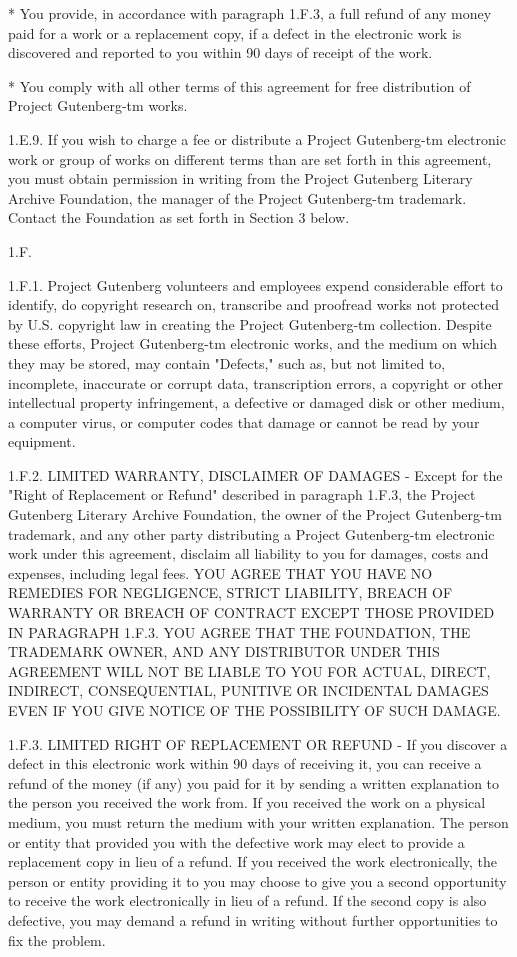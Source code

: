 * You provide, in accordance with paragraph 1.F.3, a full refund of
  any money paid for a work or a replacement copy, if a defect in the
  electronic work is discovered and reported to you within 90 days of
  receipt of the work.

* You comply with all other terms of this agreement for free
  distribution of Project Gutenberg-tm works.

1.E.9. If you wish to charge a fee or distribute a Project
Gutenberg-tm electronic work or group of works on different terms than
are set forth in this agreement, you must obtain permission in writing
from the Project Gutenberg Literary Archive Foundation, the manager of
the Project Gutenberg-tm trademark. Contact the Foundation as set
forth in Section 3 below.

1.F.

1.F.1. Project Gutenberg volunteers and employees expend considerable
effort to identify, do copyright research on, transcribe and proofread
works not protected by U.S. copyright law in creating the Project
Gutenberg-tm collection. Despite these efforts, Project Gutenberg-tm
electronic works, and the medium on which they may be stored, may
contain "Defects," such as, but not limited to, incomplete, inaccurate
or corrupt data, transcription errors, a copyright or other
intellectual property infringement, a defective or damaged disk or
other medium, a computer virus, or computer codes that damage or
cannot be read by your equipment.

1.F.2. LIMITED WARRANTY, DISCLAIMER OF DAMAGES - Except for the "Right
of Replacement or Refund" described in paragraph 1.F.3, the Project
Gutenberg Literary Archive Foundation, the owner of the Project
Gutenberg-tm trademark, and any other party distributing a Project
Gutenberg-tm electronic work under this agreement, disclaim all
liability to you for damages, costs and expenses, including legal
fees. YOU AGREE THAT YOU HAVE NO REMEDIES FOR NEGLIGENCE, STRICT
LIABILITY, BREACH OF WARRANTY OR BREACH OF CONTRACT EXCEPT THOSE
PROVIDED IN PARAGRAPH 1.F.3. YOU AGREE THAT THE FOUNDATION, THE
TRADEMARK OWNER, AND ANY DISTRIBUTOR UNDER THIS AGREEMENT WILL NOT BE
LIABLE TO YOU FOR ACTUAL, DIRECT, INDIRECT, CONSEQUENTIAL, PUNITIVE OR
INCIDENTAL DAMAGES EVEN IF YOU GIVE NOTICE OF THE POSSIBILITY OF SUCH
DAMAGE.

1.F.3. LIMITED RIGHT OF REPLACEMENT OR REFUND - If you discover a
defect in this electronic work within 90 days of receiving it, you can
receive a refund of the money (if any) you paid for it by sending a
written explanation to the person you received the work from. If you
received the work on a physical medium, you must return the medium
with your written explanation. The person or entity that provided you
with the defective work may elect to provide a replacement copy in
lieu of a refund. If you received the work electronically, the person
or entity providing it to you may choose to give you a second
opportunity to receive the work electronically in lieu of a refund. If
the second copy is also defective, you may demand a refund in writing
without further opportunities to fix the problem.

